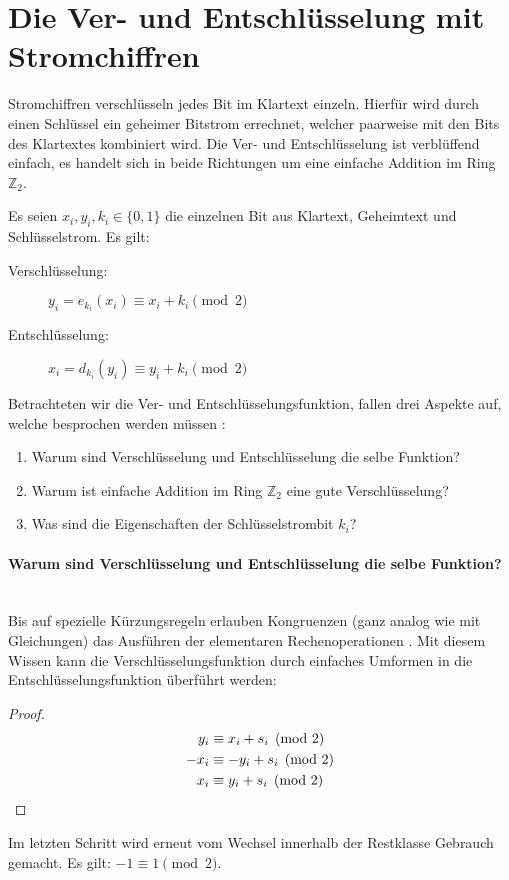 \section{Die Ver- und Entschlüsselung mit Stromchiffren}
Stromchiffren verschlüsseln jedes Bit im Klartext einzeln. Hierfür
wird durch einen Schlüs\-sel ein geheimer Bitstrom errechnet, welcher paarweise mit den Bits
des Klartextes kombiniert wird. Die Ver- und Entschlüsselung ist verblüffend einfach, es handelt
sich in beide Richtungen um eine einfache Addition im Ring $\mathbb{Z}_2$.

\begin{definition}
  Es seien $x_i,y_i,k_i \in \{0,1\}$ die einzelnen Bit aus Klartext, Geheimtext und Schlüs\-selstrom.
  Es gilt:
  \begin{description}
    \item[Verschlüsselung:] $y_i = e_{k_i}(x_i) \equiv x_i + k_i \pmod{2}$
    \item[Entschlüsselung:] $x_i = d_{k_i}(y_i) \equiv y_i + k_i \pmod{2}$
  \end{description}
\end{definition}

\noindent
Betrachteten wir die Ver- und Entschlüsselungsfunktion, fallen drei Aspekte auf, welche
besprochen werden müssen \parencite[31-34]{BOOK:crypto}:

\begin{enumerate}
  \item Warum sind Verschlüsselung und Entschlüsselung die selbe Funktion?
  \item Warum ist einfache Addition im Ring $\mathbb{Z}_2$ eine gute Verschlüsselung?
  \item Was sind die Eigenschaften der Schlüsselstrombit $k_i$?
\end{enumerate}

\paragraph{Warum sind Verschlüsselung und Entschlüsselung die selbe Funktion?}\mbox{}\\
Bis auf spezielle Kürzungsregeln erlauben Kongruenzen (ganz analog wie mit Gleichungen)
das Ausführen der elementaren Rechenoperationen \parencite[181-183]{BOOK:numberTheory}.
Mit diesem Wissen kann die Verschlüsselungsfunktion durch einfaches Umformen in die
Entschlüsselungsfunktion überführt werden:
\begin{proof}
  \begin{align*}
    y_i  & \equiv x_i + s_i \pmod{2}          \\
    -x_i & \equiv -y_i + s_i \pmod{2}         \\
    x_i  & \equiv y_i + s_i \pmod{2} \qedhere
  \end{align*}
\end{proof}
\noindent
Im letzten Schritt wird erneut vom Wechsel innerhalb der Restklasse Gebrauch gemacht.
Es gilt: $-1 \equiv 1 \pmod{2}$.

